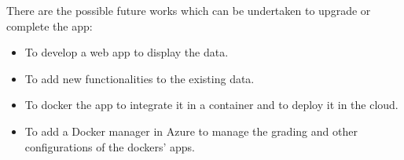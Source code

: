 \documentclass[12pt]{report} %
\begin{document}
There are the possible future works which can be undertaken to upgrade or complete the app:

\begin{itemize}
	\item To develop a web app to display the data. 
	\item To add new functionalities to the existing data.
	\item To docker the app to integrate it in a container and to deploy it in the cloud.
	\item To add a Docker manager in Azure to manage the grading and other configurations of the dockers' apps.	
\end{itemize}



\clearpage
{}
\printbibliography




\end{document}
